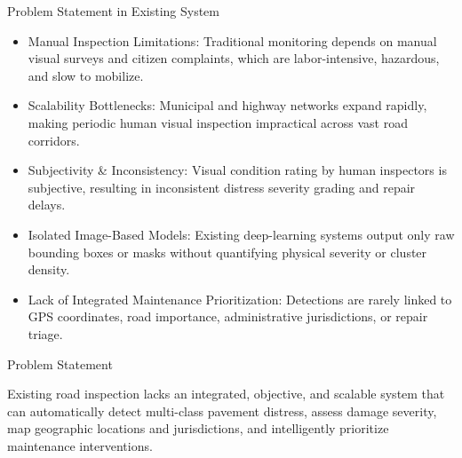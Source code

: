 \documentclass[10pt]{beamer}
\def\textbf#1{#1}%
\def\footnotesize{}%
\def\begin#1{}%
\def\end#1{}%
\def\vspace#1{}%
\begin{document}
\begin{frame}{Problem Statement in Existing System}
    \begin{itemize}
        \setlength{\itemsep}{0.45em}
        \item \textbf{Manual Inspection Limitations:} Traditional monitoring depends on manual visual surveys and citizen complaints, which are labor-intensive, hazardous, and slow to mobilize.
        \item \textbf{Scalability Bottlenecks:} Municipal and highway networks expand rapidly, making periodic human visual inspection impractical across vast road corridors.
        \item \textbf{Subjectivity \& Inconsistency:} Visual condition rating by human inspectors is subjective, resulting in inconsistent distress severity grading and repair delays.
        \item \textbf{Isolated Image-Based Models:} Existing deep-learning systems output only raw bounding boxes or masks without quantifying physical severity or cluster density.
        \item \textbf{Lack of Integrated Maintenance Prioritization:} Detections are rarely linked to GPS coordinates, road importance, administrative jurisdictions, or repair triage.
    \end{itemize}
    \vspace{0.3em}
    \begin{block}{\textbf{Problem Statement}}
        \footnotesize
        Existing road inspection lacks an integrated, objective, and scalable system that can automatically detect multi-class pavement distress, assess damage severity, map geographic locations and jurisdictions, and intelligently prioritize maintenance interventions.
    \end{block}
\end{frame}
\end{document}

